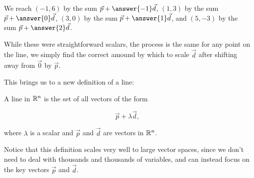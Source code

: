 \documentclass{ximera}
\begin{document}
\begin{exploration}
\begin{solution}
    \begin{center}
      \end{center}

  \end{solution}

  We reach $(-1,6)$ by the sum $\vec{p}+\answer{-1}\vec{d}$, $(1,3)$ by the sum $\vec{p}+\answer{0}\vec{d}$, $(3,0)$ by the sum $\vec{p}+\answer{1}\vec{d}$, and $(5,-3)$ by the sum $\vec{p}+\answer{2}\vec{d}$.

  While these were straightforward scalars, the process is the same for any point on the line, we simply find the correct amound by which to scale $\vec{d}$ after shifting away from $\vec{0}$ by $\vec{p}$.

\end{exploration}

This brings us to a new definition of a line:

\begin{definition}
  A line in $\mathbb{R}^n$ is the set of all vectors of the form 

  $$\vec{p}+\lambda \vec{d},$$

  where $\lambda$ is a scalar and $\vec{p}$ and $\vec{d}$ are vectors in $\mathbb{R}^n$.
\end{definition}

Notice that this definition scales very well to large vector spaces, since we don't need to deal with thousands and thousands of variables, and can instead focus on the key vectors $\vec{p}$ and $\vec{d}$.
 
\end{document}
